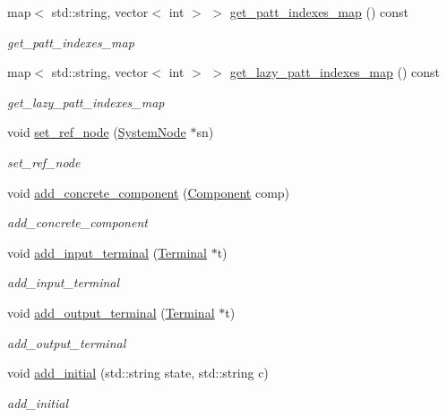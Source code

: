 \begin{DoxyCompactItemize}
map$<$ std\+::string, vector$<$ int $>$ $>$ \hyperlink{class_problem_node_ace11ab62fc8182b0c24e7f7b0c0a20a8}{get\+\_\+patt\+\_\+indexes\+\_\+map} () const 
\begin{DoxyCompactList}\small\item\em get\+\_\+patt\+\_\+indexes\+\_\+map \end{DoxyCompactList}\item 
map$<$ std\+::string, vector$<$ int $>$ $>$ \hyperlink{class_problem_node_afcb99542c2898a0c90e08d427f125e40}{get\+\_\+lazy\+\_\+patt\+\_\+indexes\+\_\+map} () const 
\begin{DoxyCompactList}\small\item\em get\+\_\+lazy\+\_\+patt\+\_\+indexes\+\_\+map \end{DoxyCompactList}\item 
void \hyperlink{class_problem_node_ae5a02932d1824b6674dcf362eafcf5de}{set\+\_\+ref\+\_\+node} (\hyperlink{class_system_node}{System\+Node} $\ast$sn)
\begin{DoxyCompactList}\small\item\em set\+\_\+ref\+\_\+node \end{DoxyCompactList}\item 
void \hyperlink{class_problem_node_aac1af94c44088e6226fa9d2d76a85fc3}{add\+\_\+concrete\+\_\+component} (\hyperlink{class_component}{Component} comp)
\begin{DoxyCompactList}\small\item\em add\+\_\+concrete\+\_\+component \end{DoxyCompactList}\item 
void \hyperlink{class_problem_node_a40f1c45f44b6c45a178cbc2caf249d39}{add\+\_\+input\+\_\+terminal} (\hyperlink{class_terminal}{Terminal} $\ast$t)
\begin{DoxyCompactList}\small\item\em add\+\_\+input\+\_\+terminal \end{DoxyCompactList}\item 
void \hyperlink{class_problem_node_a477e374fa906d9d64681af5722fe6e29}{add\+\_\+output\+\_\+terminal} (\hyperlink{class_terminal}{Terminal} $\ast$t)
\begin{DoxyCompactList}\small\item\em add\+\_\+output\+\_\+terminal \end{DoxyCompactList}\item 
void \hyperlink{class_problem_node_a399a6285036abe32e012dc352813463a}{add\+\_\+initial} (std\+::string state, std\+::string c)
\begin{DoxyCompactList}\small\item\em add\+\_\+initial \end{DoxyCompactList}\item 

\end{DoxyCompactItemize}
